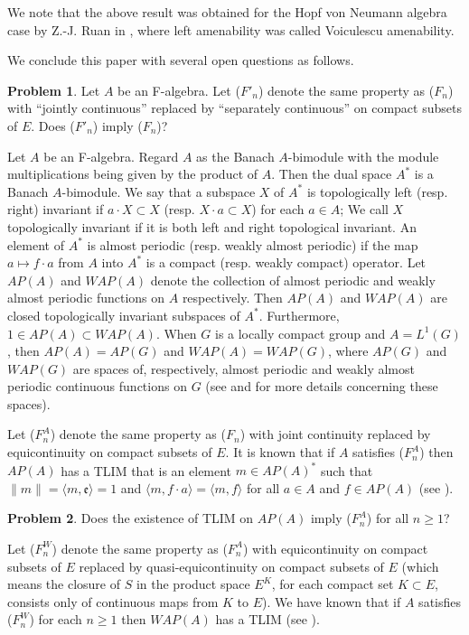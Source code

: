 \documentclass{tran-l}
\numberwithin{equation}{section}
\theoremstyle{definition}
\newtheorem{problem}{Problem}
\theoremstyle{remark}
\begin{document}
We note that the above result was obtained for the Hopf von Neumann algebra case by Z.-J. Ruan in \cite[Theorem~2.1]{Ruan}, where left amenability was called Voiculescu amenability.
 
We conclude this paper with several open questions as follows.

\begin{problem}
Let $A$ be an F-algebra. Let ($F'_n$) denote the same property as ($F_n$) with ``jointly continuous'' replaced by ``separately continuous'' on compact subsets of $E$. Does ($F'_n$) imply ($F_n$)?
\end{problem}

Let $A$ be an F-algebra. Regard $A$ as the Banach $A$-bimodule with the module multiplications being given by the product of $A$. Then the dual space $A^*$ is a Banach $A$-bimodule. 
We say that a subspace $X$ of $A^*$ is topologically left (resp. right) invariant if $a\cdot X \subset X$ (resp. $X\cdot a\subset X$) for each $a\in A$; We call $X$ topologically invariant if it is both left and right topological invariant. An element of $A^*$ is almost periodic (resp. weakly almost periodic) if the map $a\mapsto f\cdot a$ from $A$ into $A^*$ is a compact (resp. weakly compact) operator. Let $AP(A)$ and $WAP(A)$ denote the collection of almost periodic and weakly almost periodic functions on $A$ respectively. Then $AP(A)$ and $WAP(A)$ are closed topologically invariant subspaces of $A^*$. Furthermore, $1\in AP(A) \subset WAP(A)$. When $G$ is a locally compact group and $A= L^1(G)$, then $AP(A)= AP(G)$ and $WAP(A)= WAP(G)$, where $AP(G)$ and  $WAP(G)$ are spaces of, respectively,  almost periodic and  weakly almost periodic continuous functions on $G$ (see \cite{Lau 87} and \cite{Lau-Z, L-Z1} for more details concerning these spaces). 

Let ($F_n^A$) denote the same property as ($F_n$) with joint continuity replaced by  equicontinuity on compact subsets of $E$. It is known that if $A$ satisfies ($F_n^A$) then $AP(A)$ has a TLIM that is an element $m\in AP(A)^*$ such that $\|m\|={\langle} m,{\mathfrak{e}}{\rangle} =1$ and ${\langle} m, f\cdot a{\rangle} = {\langle} m, f{\rangle}$ for all $a\in A$ and $f\in AP(A)$ (see \cite{Lau_AG}). 

\begin{problem}
Does the existence of TLIM on $AP(A)$ imply ($F_n^A$) for all $n\geq 1$?
\end{problem}

Let ($F_n^W$) denote the same property as ($F_n^A$) with equicontinuity on compact subsets of $E$ replaced by quasi-equicontinuity on compact subsets of $E$ (which means the closure of $S$ in the product space $E^K$, for each compact set $K\subset E$, consists only of continuous maps from $K$ to $E$). We have known that if $A$ satisfies ($F_n^W$) for each $n\geq 1$ then $WAP(A)$ has a TLIM (see \cite{Lau_AG}).   
\end{document}
